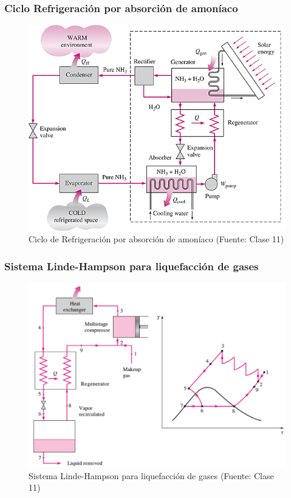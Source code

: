         \subsubsection{Ciclo Refrigeración por absorción de amoníaco}
        
        \begin{figure}
            \includegraphics[width=.65\textwidth]{img/clases/ciclo_ref_amon.png}
            \caption{Ciclo de Refrigeración por absorción de amoníaco (Fuente: Clase 11)}
            \label{fig:ciclo_ref_amon}
        \end{figure}
        
        \subsubsection{Sistema Linde-Hampson para liquefacción de gases}
        
        \begin{figure}
            \includegraphics[width=.65\textwidth]{img/clases/ciclo_linde_hampson.png}
            \caption{Sistema Linde-Hampson para liquefacción de gases (Fuente: Clase 11)}
            \label{fig:ciclo_linde_hampson}
        \end{figure}
        

